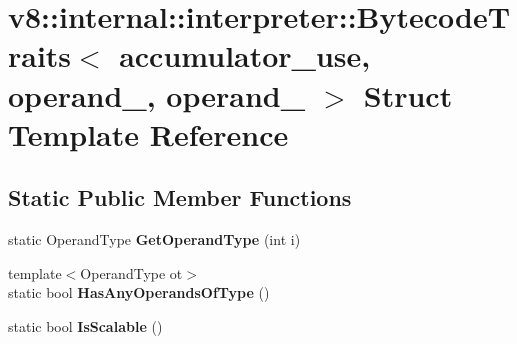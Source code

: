 \hypertarget{structv8_1_1internal_1_1interpreter_1_1_bytecode_traits_3_01accumulator__use_00_01operand__0_00_01operand__1_01_4}{}\section{v8\+:\+:internal\+:\+:interpreter\+:\+:Bytecode\+Traits$<$ accumulator\+\_\+use, operand\+\_, operand\+\_ $>$ Struct Template Reference}
\label{structv8_1_1internal_1_1interpreter_1_1_bytecode_traits_3_01accumulator__use_00_01operand__0_00_01operand__1_01_4}
\subsection*{Static Public Member Functions}
\begin{DoxyCompactItemize}
\item 
static Operand\+Type {\bfseries Get\+Operand\+Type} (int i)\hypertarget{structv8_1_1internal_1_1interpreter_1_1_bytecode_traits_3_01accumulator__use_00_01operand__0_00_01operand__1_01_4_a22d832656ed8c7d6039a3c461a315789}{}\label{structv8_1_1internal_1_1interpreter_1_1_bytecode_traits_3_01accumulator__use_00_01operand__0_00_01operand__1_01_4_a22d832656ed8c7d6039a3c461a315789}

\item 
{\footnotesize template$<$Operand\+Type ot$>$ }\\static bool {\bfseries Has\+Any\+Operands\+Of\+Type} ()\hypertarget{structv8_1_1internal_1_1interpreter_1_1_bytecode_traits_3_01accumulator__use_00_01operand__0_00_01operand__1_01_4_a02c6002a1800cb16fa797148136d721a}{}\label{structv8_1_1internal_1_1interpreter_1_1_bytecode_traits_3_01accumulator__use_00_01operand__0_00_01operand__1_01_4_a02c6002a1800cb16fa797148136d721a}

\item 
static bool {\bfseries Is\+Scalable} ()\hypertarget{structv8_1_1internal_1_1interpreter_1_1_bytecode_traits_3_01accumulator__use_00_01operand__0_00_01operand__1_01_4_a738f00ee0303cc1c564d8600d83e5249}{}\label{structv8_1_1internal_1_1interpreter_1_1_bytecode_traits_3_01accumulator__use_00_01operand__0_00_01operand__1_01_4_a738f00ee0303cc1c564d8600d83e5249}

\end{DoxyCompactItemize}
